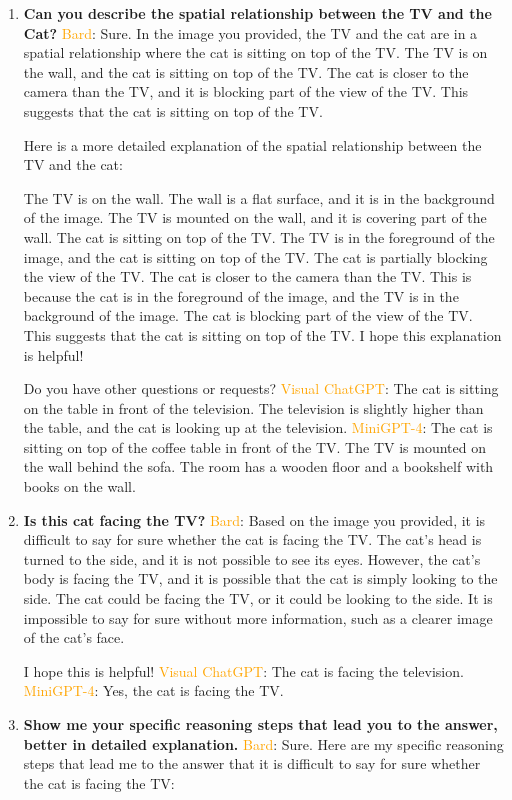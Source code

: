 \begin{enumerate}
    \item \textbf{Can you describe the spatial relationship between the TV and the Cat?}
    \subitem \textcolor{orange}{Bard}: 
    Sure. In the image you provided, the TV and the cat are in a spatial relationship where the cat is sitting on top of the TV. The TV is on the wall, and the cat is sitting on top of the TV. The cat is closer to the camera than the TV, and it is blocking part of the view of the TV. This suggests that the cat is sitting on top of the TV.

    Here is a more detailed explanation of the spatial relationship between the TV and the cat:

    The TV is on the wall. The wall is a flat surface, and it is in the background of the image. The TV is mounted on the wall, and it is covering part of the wall.
    The cat is sitting on top of the TV. The TV is in the foreground of the image, and the cat is sitting on top of the TV. The cat is partially blocking the view of the TV.
    The cat is closer to the camera than the TV. This is because the cat is in the foreground of the image, and the TV is in the background of the image.
    The cat is blocking part of the view of the TV. This suggests that the cat is sitting on top of the TV.
    I hope this explanation is helpful!

    Do you have other questions or requests?
    \subitem \textcolor{orange}{Visual ChatGPT}: The cat is sitting on the table in front of the television. The television is slightly higher than the table, and the cat is looking up at the television.
    \subitem \textcolor{orange}{MiniGPT-4}: The cat is sitting on top of the coffee table in front of the TV. The TV is mounted on the wall behind the sofa. The room has a wooden floor and a bookshelf with books on the wall.
    \item \textbf{Is this cat facing the TV?}
    \subitem \textcolor{orange}{Bard}: Based on the image you provided, it is difficult to say for sure whether the cat is facing the TV. The cat's head is turned to the side, and it is not possible to see its eyes. However, the cat's body is facing the TV, and it is possible that the cat is simply looking to the side. The cat could be facing the TV, or it could be looking to the side. It is impossible to say for sure without more information, such as a clearer image of the cat's face.

    I hope this is helpful!
    \subitem \textcolor{orange}{Visual ChatGPT}: The cat is facing the television.
    \subitem \textcolor{orange}{MiniGPT-4}: Yes, the cat is facing the TV.
    \item \textbf{Show me your specific reasoning steps that lead you to the answer, better in detailed explanation.}
    \subitem \textcolor{orange}{Bard}: Sure. Here are my specific reasoning steps that lead me to the answer that it is difficult to say for sure whether the cat is facing the TV:


\end{enumerate}
